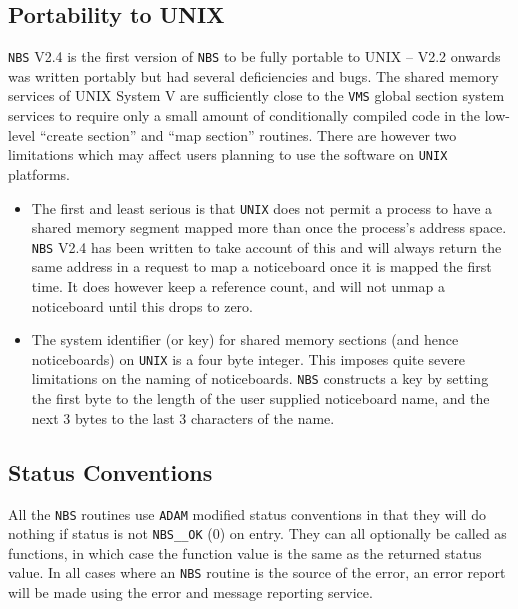       \subsection {Portability to UNIX} 
      {\tt NBS} V2.4 is the first version of {\tt NBS} to be fully portable
      to UNIX -- V2.2 onwards was written portably but had several 
      deficiencies and bugs. The shared memory services of UNIX System V
      are sufficiently close to the {\tt VMS} global section system 
      services to require only a small amount of conditionally compiled code
      in the low-level ``create section'' and ``map section'' routines. 
      There are however two limitations which may affect users planning
      to use the software on {\tt UNIX} platforms. 

\begin{itemize}
\item The first and least serious is that {\tt UNIX} does not permit
a process to have a shared memory segment mapped more than once 
the process's address space. {\tt NBS} V2.4 has been written to take
account of this and will always return the same address in a request
to map a noticeboard once it is mapped the first time. It does however
keep a reference count, and will not unmap a noticeboard until this
drops to zero.
\item The system identifier (or key) for shared memory sections (and hence
noticeboards) on {\tt UNIX} is a four byte integer. This imposes 
quite severe limitations on the naming of noticeboards. {\tt NBS}
constructs a key by setting the first byte to the length of the user
supplied noticeboard name, and the next 3 bytes to the last 3 characters
of the name.
\end{itemize}
       
      \subsection {Status Conventions} All the {\tt NBS} routines use {%
\tt ADAM} modified
      status conventions in that they will do nothing if status is not {%
\tt NBS\_\_OK}
      (0) on entry. They can all optionally be called as functions, in which
      case the function value is the same as the returned status value. In
      all cases where an {\tt NBS} routine is the source of the error, an 
      error report will be made using the error and message reporting service.

